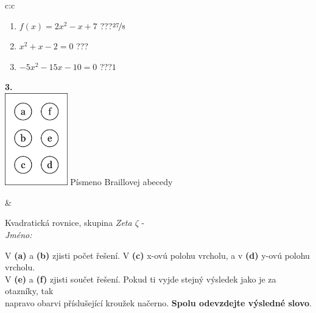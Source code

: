 \documentclass[10pt]{report}
\begin{document}
\begin{tabular}{c:c}
\begin{minipage}[c][104.5mm][t]{0.5\linewidth}
\begin{center}
\begin{minipage}{0.79\linewidth}
\begin{center}
\begin{varwidth}{\linewidth}
\begin{enumerate}
\item $f(x)=2x^2-x+7$\quad \dotfill\; ???\;\dotfill \quad $\nicefrac{27}{8}$
\item $x^2+x-2=0$\quad \dotfill\; ???\;\dotfill {}
\item $-5x^2-15x-10=0$\quad \dotfill\; ???\;\dotfill \quad $1$
\end{enumerate}
\end{varwidth}
\end{center}
\end{minipage}
\begin{minipage}{0.20\linewidth}
\begin{center}
{\Huge\bfseries 3.} \\[2mm]
\includegraphics[height=40mm]{../images/braille.png}
{\small Písmeno Braillovej abecedy}
\end{center}
\end{minipage}
\end{center}
\end{minipage}
&
\begin{minipage}[c][104.5mm][t]{0.5\linewidth}
\begin{center}
\vspace{7mm}
{\huge Kvadratická rovnice, skupina \textit{Zeta $\zeta$} -}\\[5mm]
\textit{Jméno:}\phantom{xxxxxxxxxxxxxxxxxxxxxxxxxxxxxxxxxxxxxxxxxxxxxxxxxxxxxxxxxxxxxxxxx}\\[5mm]
\begin{minipage}{0.95\linewidth}
\begin{center}
V \textbf{(a)} a \textbf{(b)} zjisti počet řešení. V \textbf{(c)} x-ovú polohu vrcholu, a v \textbf{(d)} y-ovú polohu vrcholu.\\V \textbf{(e)} a \textbf{(f)} zjisti součet řešení. Pokud ti vyjde stejný výsledek jako je za otazníky, tak\\napravo obarvi příslušející kroužek načerno. \textbf{Spolu odevzdejte výsledné slovo}.
\end{center}
\end{minipage}
\\[1mm]

\end{center}
\end{minipage}
\end{tabular}
\end{document}
